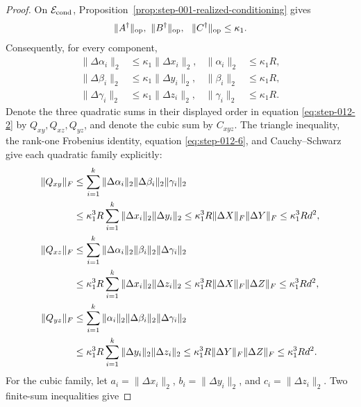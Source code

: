 \begin{proof}
On \(\mathcal E_{\rm cond}\), Proposition~\ref{prop:step-001-realized-conditioning} gives
\begin{equation}
  \|A^\dagger\|_{\rm op},\ \|B^\dagger\|_{\rm op},\
  \ \|C^\dagger\|_{\rm op}\le\kappa_1.                   \label{eq:step-012-5}
\end{equation}
Consequently, for every component,
\begin{equation}
\begin{aligned}
  \|\Delta\alpha_i\|_2&\le\kappa_1\|\Delta x_i\|_2,
  &\|\alpha_i\|_2&\le\kappa_1R,\\
  \|\Delta\beta_i\|_2&\le\kappa_1\|\Delta y_i\|_2,
  &\|\beta_i\|_2&\le\kappa_1R,\\
  \|\Delta\gamma_i\|_2&\le\kappa_1\|\Delta z_i\|_2,
  &\|\gamma_i\|_2&\le\kappa_1R.
\end{aligned}\label{eq:step-012-6}
\end{equation}
Denote the three quadratic sums in their displayed order in equation \eqref{eq:step-012-2} by
\(Q_{xy},Q_{xz},Q_{yz}\), and denote the cubic sum by \(C_{xyz}\). The
triangle inequality, the rank-one Frobenius identity, equation \eqref{eq:step-012-6}, and
Cauchy--Schwarz give each quadratic family explicitly:
\begin{align}
  \|Q_{xy}\|_F
  &\le\sum_{i=1}^k
       \|\Delta\alpha_i\|_2\|\Delta\beta_i\|_2\|\gamma_i\|_2\notag\\
  &\le\kappa_1^3R
       \sum_{i=1}^k\|\Delta x_i\|_2\|\Delta y_i\|_2
   \le\kappa_1^3R\|\Delta X\|_F\|\Delta Y\|_F
   \le\kappa_1^3Rd^2,                                    \label{eq:step-012-7}\\
  \|Q_{xz}\|_F
  &\le\sum_{i=1}^k
       \|\Delta\alpha_i\|_2\|\beta_i\|_2\|\Delta\gamma_i\|_2\notag\\
  &\le\kappa_1^3R
       \sum_{i=1}^k\|\Delta x_i\|_2\|\Delta z_i\|_2
   \le\kappa_1^3R\|\Delta X\|_F\|\Delta Z\|_F
   \le\kappa_1^3Rd^2,                                    \label{eq:step-012-8}\\
  \|Q_{yz}\|_F
  &\le\sum_{i=1}^k
       \|\alpha_i\|_2\|\Delta\beta_i\|_2\|\Delta\gamma_i\|_2\notag\\
  &\le\kappa_1^3R
       \sum_{i=1}^k\|\Delta y_i\|_2\|\Delta z_i\|_2
   \le\kappa_1^3R\|\Delta Y\|_F\|\Delta Z\|_F
   \le\kappa_1^3Rd^2.                                    \label{eq:step-012-9}
\end{align}
For the cubic family, let
\(a_i=\|\Delta x_i\|_2\),
\(b_i=\|\Delta y_i\|_2\), and
\(c_i=\|\Delta z_i\|_2\). Two finite-sum inequalities give

\end{proof}

